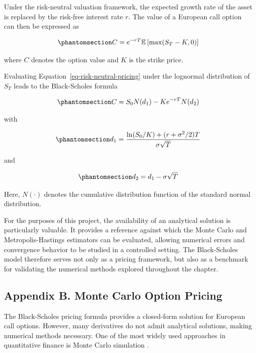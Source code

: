 \documentclass[
  12pt,
  letterpaper,
]{book}
\begin{document}
Under the risk-neutral valuation framework, the expected growth rate of
the asset is replaced by the risk-free interest rate \(r\). The value of
a European call option can then be expressed as

\begin{equation}\phantomsection\label{eq-risk-neutral-pricing}{
C = e^{-rT}\mathbb{E}\left[\max(S_T-K,0)\right]
}\end{equation}

where \(C\) denotes the option value and \(K\) is the strike price.

Evaluating Equation~\ref{eq-risk-neutral-pricing} under the lognormal
distribution of \(S_T\) leads to the Black-Scholes formula

\begin{equation}\phantomsection\label{eq-black-scholes}{
C = S_0N(d_1) - Ke^{-rT}N(d_2)
}\end{equation}

with

\begin{equation}\phantomsection\label{eq-d1}{
d_1 =
\frac{
\ln(S_0/K) + (r+\sigma^2/2)T
}
{
\sigma\sqrt{T}
}
}\end{equation}

and

\begin{equation}\phantomsection\label{eq-d2}{
d_2 = d_1 - \sigma\sqrt{T}
}\end{equation}

Here, \(N(\cdot)\) denotes the cumulative distribution function of the
standard normal distribution.

For the purposes of this project, the availability of an analytical
solution is particularly valuable. It provides a reference against which
the Monte Carlo and Metropolis-Hastings estimators can be evaluated,
allowing numerical errors and convergence behavior to be studied in a
controlled setting. The Black-Scholes model therefore serves not only as
a pricing framework, but also as a benchmark for validating the
numerical methods explored throughout the chapter.

\subsection{Appendix B. Monte Carlo Option
Pricing}\label{appendix-b.-monte-carlo-option-pricing}

The Black-Scholes pricing formula provides a closed-form solution for
European call options. However, many derivatives do not admit analytical
solutions, making numerical methods necessary. One of the most widely
used approaches in quantitative finance is Monte Carlo simulation
.
\end{document}
